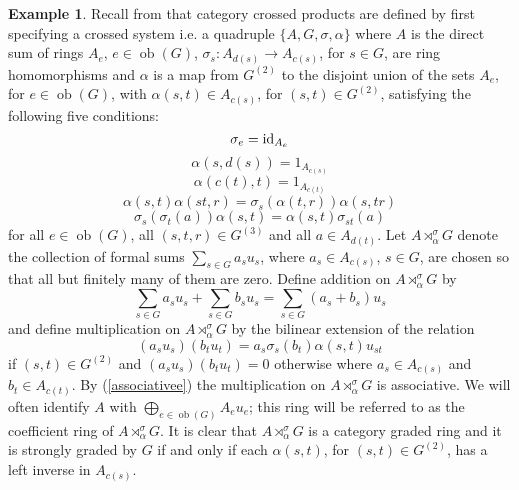 \documentclass[11pt,leqno]{amsart}
\theoremstyle{plain}
\theoremstyle{definition}
\newtheorem{exmp}{Example}
\DeclareMathOperator{\ob}{ob}
\begin{document}
\begin{exmp}\label{example1}
Recall from \cite{oinlun08} that category crossed products are defined by
first specifying a crossed system i.e. a quadruple
$\{ A,G,\sigma,\alpha \}$ where
$A$ is the direct sum of rings $A_e$, $e \in \ob(G)$,
$\sigma_s : A_{d(s)} \rightarrow A_{c(s)}$, for $s \in G$,
are ring homomorphisms and
$\alpha$ is a map from $G^{(2)}$ to the
disjoint union of the sets $A_e$, for $e \in \ob(G)$,
with $\alpha(s,t) \in A_{c(s)}$,
for $(s,t) \in G^{(2)}$, satisfying the following five conditions:
\begin{equation}\label{idd}
\sigma_e = {\rm id}_{A_e}
\end{equation}
\begin{equation}\label{identityr}
\alpha(s,d(s)) = 1_{A_{c(s)}}
\end{equation}
\begin{equation}\label{identityl}
\alpha(c(t),t) = 1_{A_{c(t)}}
\end{equation}
\begin{equation}\label{associativee}
\alpha(s,t) \alpha(st,r) = \sigma_s(\alpha(t,r)) \alpha(s,tr)
\end{equation}
\begin{equation}\label{algebraa}
\sigma_s(\sigma_t(a)) \alpha(s,t) = \alpha(s,t) \sigma_{st}(a)
\end{equation}
for all $e \in \ob(G)$, all $(s,t,r) \in G^{(3)}$ and all $a \in A_{d(t)}$.
Let $A \rtimes_{\alpha}^{\sigma} G$ denote the collection of formal sums
$\sum_{s \in G} a_s u_s$, where $a_s \in A_{c(s)}$, $s \in G$,
are chosen so that all but finitely many of them are zero.
Define addition on $A \rtimes_{\alpha}^{\sigma} G$
by
\begin{equation}\label{addition}
\sum_{s \in G} a_s u_s + \sum_{s \in G} b_s u_s =
\sum_{s \in G} (a_s + b_s)u_s
\end{equation}
and define multiplication on $A \rtimes_{\alpha}^{\sigma} G$ by
the bilinear extension of the relation
\begin{equation}\label{multiplication}
(a_s u_s)(b_t u_t) = a_s \sigma_s(b_t) \alpha(s,t) u_{st}
\end{equation}
if $(s,t) \in G^{(2)}$ and $(a_s u_s)(b_t u_t) = 0$ otherwise
where $a_s \in A_{c(s)}$ and $b_t \in A_{c(t)}$.
By (\ref{associativee}) the multiplication on
$A \rtimes_{\alpha}^{\sigma} G$ is associative.
We will often identify $A$ with
$\bigoplus_{e \in \ob(G)} A_e u_e$; this ring will be referred
to as the coefficient ring of $A \rtimes_{\alpha}^{\sigma} G$.
It is clear that $A \rtimes_{\alpha}^{\sigma} G$ is a category graded ring
and it is strongly graded by $G$
if and only if each $\alpha(s,t)$, for $(s,t) \in G^{(2)}$,
has a left inverse in $A_{c(s)}$.
\end{exmp}
\end{document}
